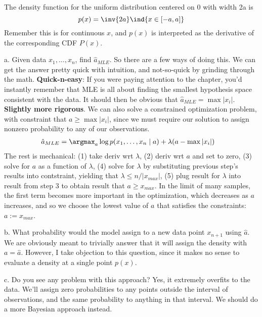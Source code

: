 \documentclass[11pt]{article}
\begin{document}
\begin{example}
	 The density function for the uniform distribution centered on 0 with width 2a is
$$
p(x) = \inv{2a} \ind\{x \in [-a, a]\}
$$
Remember this is for continuous $x$, and $p(x)$ is interpreted as the derivative of the corresponding CDF $P(x)$. 
\tcblower


a. Given data $x_1, \ldots, x_n$, find $\hat{a}_{MLE}$. So there are a few ways of doing this. We can get the answer pretty quick with intuition, and not-so-quick by grinding through the math. \textbf{Quick-n-easy}: If you were paying attention to the chapter, you'd instantly remember that MLE is all about finding the smallest hypothesis space consistent with the data. It should then be obvious that $\hat{a}_{MLE} = \max |x_i|$. \textbf{Slightly more rigorous}. We can also solve a constrained optimization problem, with constraint that $a \ge \max |x_i|$, since we must require our solution to assign nonzero probability to any of our observations. 
\begin{align}
	\hat{a}_{MLE}
		&= \argmax_a \log p(x_1, \ldots, x_n \mid a) + \lambda (a - \max |x_i|)
\end{align}
The rest is mechanical: (1) take deriv wrt $\lambda$, (2) deriv wrt $a$ and set to zero, (3) solve for $a$ as a function of $\lambda$, (4) solve for $\lambda$ by substituting previous step's results into contstraint, yielding that $\lambda \le n/|x_{max}|$, (5) plug result for $\lambda$ into result from step 3 to obtain result that $a \ge x_{max}$. In the limit of many samples, the first term becomes more important in the optimization, which decreases as $a$ increases, and so we choose the lowest value of $a$ that satisfies the constraints: $a := x_{max}$. 

b. What probability would the model assign to a new data point $x_{n+1}$ using $\hat a$. We are obviously meant to trivially answer that it will assign the density with $a=\hat a$. However, I take objection to this question, since it makes no sense to evaluate a density at a single point $p(x)$. 

c. Do you see any problem with this approach? Yes, it extremely overfits to the data. We'll assign zero probabilities to any points outside the interval of observations, and the same probability to anything in that interval. We should do a more Bayesian approach instead. 
\end{example}
\end{document}
